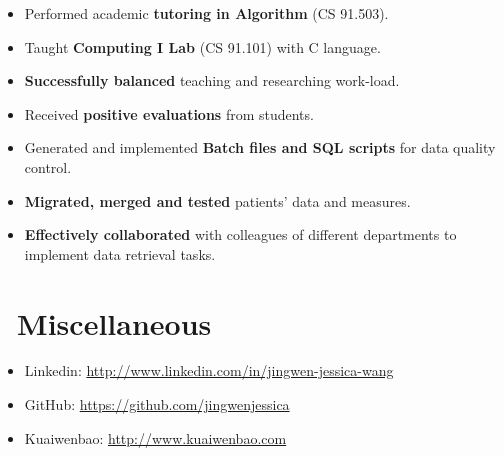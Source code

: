 \documentclass{resume}
\begin{document}
\begin{itemize}
  \item Performed academic \textbf{tutoring in Algorithm} (CS 91.503).
  \item Taught \textbf{Computing I Lab} (CS 91.101) with C language.
  \item \textbf{Successfully balanced} teaching and researching work-load.
  \item Received \textbf{positive evaluations} from students.
\end{itemize}



\begin{itemize}
  \item Generated and implemented \textbf{Batch files and SQL scripts} for data quality control.
  \item \textbf{Migrated, merged and tested} patients’ data and measures.
  \item \textbf{Effectively collaborated} with colleagues of different departments to implement data retrieval tasks.
\end{itemize}



\section{\faInfo\ Miscellaneous}

\begin{itemize}[parsep=0.5ex]
  \item Linkedin: \url{http://www.linkedin.com/in/jingwen-jessica-wang}
  \item GitHub: \url{https://github.com/jingwenjessica}
  \item Kuaiwenbao: \url{http://www.kuaiwenbao.com}
\end{itemize}
\end{document}
